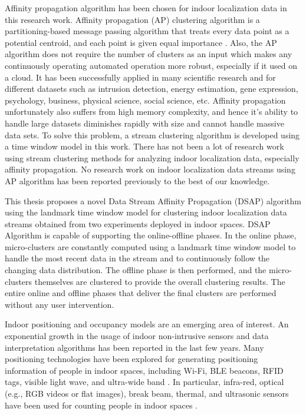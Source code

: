 Affinity propagation algorithm has been chosen for indoor localization data in this research work. Affinity propagation (AP) clustering algorithm is a partitioning-based message passing algorithm that treats every data point as a potential centroid, and each point is given equal importance \cite{dueck2009affinity}. Also, the AP algorithm does not require the number of clusters as an input which makes any continuously operating automated operation more robust, especially if it used on a cloud. It has been successfully applied in many scientific research and for different datasets such as intrusion detection, energy estimation, gene expression, psychology, business, physical science, social science, etc. 
Affinity propagation unfortunately also suffers from high memory complexity, and hence it's ability to handle large datasets diminishes rapidly with size and cannot handle massive data sets. To solve this problem, a stream clustering algorithm is developed using a time window model in this work. There has not been a lot of research work using stream clustering methods for analyzing indoor localization data, especially affinity propagation. No research work on indoor localization data streams using AP algorithm has been reported previously to the best of our knowledge.

This thesis proposes a novel Data Stream Affinity Propagation (DSAP) algorithm using the landmark time window model for clustering indoor localization data streams obtained from two experiments deployed in indoor spaces. DSAP Algorithm is capable of supporting the online-offline phases. In the online phase, micro-clusters are constantly computed using a landmark time window model to handle the most recent data in the stream and to continuously follow the changing data distribution. The offline phase is then performed, and the micro-clusters themselves are clustered to provide the overall clustering results. The entire online and offline phases that deliver the final clusters are performed without any user intervention.

Indoor positioning and occupancy models are an emerging area of interest. An exponential growth in the usage of indoor non-intrusive sensors and data interpretation algorithms has been reported in the last few years. 
Many positioning technologies have been explored for generating positioning information of people in indoor spaces, including Wi-Fi, BLE beacons, RFID tags, visible light wave, and ultra-wide band \cite{namiot2015indoor, jeon2018ble}. In particular, infra-red, optical (e.g., RGB videos or flat images), break beam, thermal, and ultrasonic sensors have been used for counting people in indoor spaces \cite{mautz2012indoor}. 

